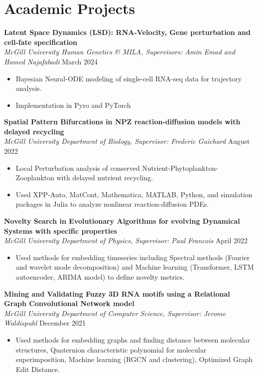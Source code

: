 \documentclass{article}
\newcommand{\cvsection}[1]{\section*{\rmfamily#1}}
\begin{document}
\cvsection{Academic Projects}
\indent

\textbf{Latent Space Dynamics (LSD): RNA-Velocity, Gene perturbation and cell-fate specification}\\
\indent
\textit{McGill University Human Genetics \& MILA, Supervisors: Amin Emad and Hamed Najafabadi} \hfill March 2024
\begin{itemize}
    \item[] Bayesian Neural-ODE modeling of single-cell RNA-seq data for trajectory analysis.
    \item[] Implementation in Pyro and PyTorch
\end{itemize}

\textbf{Spatial Pattern Bifurcations in NPZ reaction-diffusion models with delayed recycling}\\
\indent
\textit{McGill University Department of Biology, Supervisor: Frederic Guichard } \hfill August 2022
\begin{itemize}
    \item[] Local Perturbation analysis of conserved Nutrient-Phytoplankton-Zooplankton with delayed nutrient recycling.
    \item[] Used XPP-Auto, MatCont, Mathematica, MATLAB, Python, and simulation packages in Julia to analyze nonlinear reaction-diffusion PDEs.
\end{itemize}

\textbf{Novelty Search in Evolutionary Algorithms for evolving Dynamical Systems with specific properties}\\
\indent
\textit{McGill University Department of Physics, Supervisor: Paul Francois } \hfill April 2022
\begin{itemize}
    \item[] Used methods for embedding timeseries including Spectral methods (Fourier and wavelet mode decomposition) and Machine learning (Transformer, LSTM autoencoder, ARIMA model) to define novelty metrics.
\end{itemize}

\textbf{Mining and Validating Fuzzy 3D RNA motifs using a Relational Graph Convolutional Network model}\\
\indent
\textit{McGill University Department of Computer Science, Supervisor: Jerome Waldispuhl } \hfill December 2021
\begin{itemize}
    \item[] Used methods for embedding graphs and finding distance between molecular structures, Quaternion characteristic polynomial for molecular superimposition, Machine learning (RGCN and clustering), Optimized Graph Edit Distance.
\end{itemize}
\end{document}
